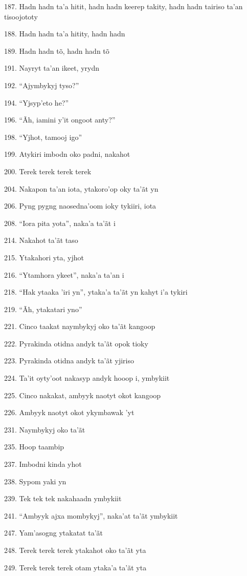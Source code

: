 187. Hadn hadn ta'a hitit, hadn hadn keerep takity, hadn hadn tairiso
ta'an tisoojototy

188. Hadn hadn ta'a hitity, hadn hadn

189. Hadn hadn tõ, hadn hadn tõ

191. Nayryt ta'an ikeet, yrydn

192. ``Ajymbykyj tyso?''

194. ``Yjsyp'eto he?''

196. ``Ãh, iamini y'it ongoot anty?''

198. ``Yjhot, tamooj igo''

199. Atykiri imbodn oko padni, nakahot

200. Terek terek terek terek

204. Nakapon ta'an iota, ytakoro'op oky ta'ãt yn

206. Pyng pygng naosedna'oom ioky tykiiri, iota

208. ``Iora pita yota'', naka'a ta'ãt i

214. Nakahot ta'ãt taso

215. Ytakahori yta, yjhot

216. ``Ytamhora ykeet'', naka'a ta'an i

218. ``Hak ytaaka 'iri yn'', ytaka'a ta'ãt yn kahyt i'a tykiri

219. ``Ãh, ytakatari yno''

221. Cinco taakat naymbykyj oko ta'ãt kangoop

222. Pyrakinda otidna andyk ta'ãt opok tioky

223. Pyrakinda otidna andyk ta'ãt yjiriso

224. Ta'it oyty'oot nakasyp andyk hooop i, ymbykiit

225. Cinco nakakat, ambyyk naotyt okot kangoop

226. Ambyyk naotyt okot ykymbawak 'yt

231. Naymbykyj oko ta'ãt

235. Hoop taambip

237. Imbodni kinda yhot

238. Sypom yaki yn

239. Tek tek tek nakahaadn ymbykiit

241. ``Ambyyk ajxa mombykyj'', naka'at ta'ãt ymbykiit

247. Yam'asogng ytakatat ta'ãt

248. Terek terek terek ytakahot oko ta'ãt yta

249. Terek terek terek otam ytaka'a ta'ãt yta

